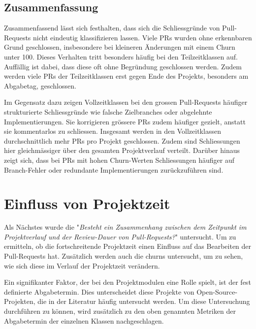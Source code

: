 \subsection{Zusammenfassung}

Zusammenfassend lässt sich festhalten, dass sich die Schliessgründe von Pull-\linebreak Requests nicht eindeutig klassifizieren lassen. Viele PRs wurden ohne erkennbaren Grund geschlossen, insbesondere bei kleineren Änderungen mit einem Churn unter 100. Dieses Verhalten tritt besonders häufig bei den Teilzeitklassen auf. Auffällig ist dabei, dass diese oft ohne Begründung geschlossen werden. Zudem werden viele PRs der Teilzeitklassen erst gegen Ende des Projekts, besonders am Abgabetag, geschlossen.

Im Gegensatz dazu zeigen Vollzeitklassen bei den grossen Pull-Requests häufiger strukturierte Schliessgründe wie falsche Zielbranches oder abgelehnte Implementierungen. Sie korrigieren grössere PRs zudem häufiger gezielt, anstatt sie kommentarlos zu schliessen. Insgesamt werden in den Vollzeitklassen durchschnittlich mehr PRs pro Projekt geschlossen. Zudem sind Schliessungen hier gleichmässiger über den gesamten Projektverlauf verteilt. Darüber hinaus zeigt sich, dass bei PRs mit hohen Churn-Werten Schliessungen häufiger auf Branch-Fehler oder redundante Implementierungen zurückzuführen sind.

\section{Einfluss von Projektzeit}
Als Nächstes wurde die  "\textit{Besteht ein Zusammenhang zwischen dem Zeitpunkt im Projektverlauf und der Review-Dauer von Pull-Requests?}" untersucht. Um zu ermitteln, ob die fortschreitende Projektzeit einen Einfluss auf das Bearbeiten der Pull-Requests hat. Zusätzlich werden auch die churns untersucht, um zu sehen, wie sich diese im Verlauf der Projektzeit verändern. 


Ein signifikanter Faktor, der bei den Projektmodulen eine Rolle spielt, ist der fest definierte Abgabetermin. Dies unterscheidet diese Projekte von Open-Source-Projek\-ten, die in der Literatur häufig untersucht werden. Um diese Untersuchung durchführen zu können, wird zusätzlich zu den oben genannten Metriken der Abgabetermin der einzelnen Klassen nachgeschlagen.

